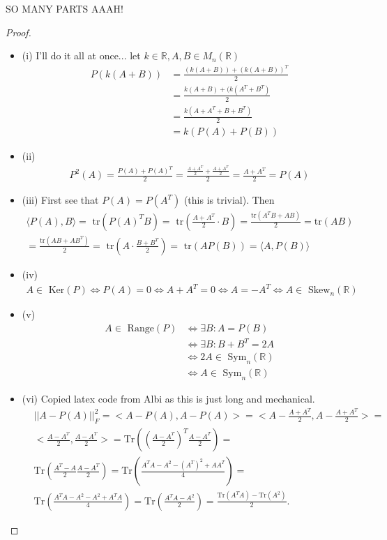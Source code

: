 \documentclass[12pt]{article}
\newenvironment{problem}[2][Problem]{\begin{trivlist}
\item[\hskip \labelsep {\bfseries #1}\hskip \labelsep {\bfseries #2.}]}{\end{trivlist}}
\theoremstyle{definition}
\theoremstyle{definition}
\theoremstyle{definition}
\theoremstyle{definition}
\begin{document}
\begin{problem}{3.48} SO MANY PARTS AAAH!
\begin{proof}
\begin{itemize}
\item (i) I'll do it all at once... let $k \in \mathbb{R}, A,B \in M_n(\mathbb{R})$
\begin{align*}
P(k(A+B)) &= \frac{(k(A+B))+(k(A+B))^T}{2} \\
&= \frac{k(A+B)+(k(A^T+B^T)}{2} \\
&= \frac{k(A+A^T+B+B^T)}{2} \\
&= k(P(A)+P(B))
\end{align*}
\item (ii) 
\begin{align*}
P^2(A) = \frac{P(A)+P(A)^T}{2} = \frac{\frac{A+A^T}{2}+\frac{A+A^T}{2}}{2} = \frac{A+A^T}{2} = P(A)
\end{align*}
\item (iii) First see that $P(A) = P(A^T)$ (this is trivial). Then
\begin{align*}
\langle P(A), B \rangle = \text{ tr}(P(A)^TB) =\text{ tr}(\frac{A+A^T}{2} \cdot B) = \frac{\text{tr}(A^TB+AB)}{2} = \text{tr}(AB) \\
= \frac{\text{tr}(AB+AB^T)}{2} =  \text{ tr}(A \cdot \frac{B+B^T}{2}) = \text{ tr}(AP(B)) = \langle A, P(B) \rangle 
\end{align*}
\item (iv) 
\begin{align*}
A \in \text{ Ker}(P) \iff P(A) = 0 \iff A+A^T = 0 \iff A = -A^T \iff A \in \text{ Skew}_n(\mathbb{R})
\end{align*}
\item (v)
\begin{align*}
A \in \text{ Range}(P) &\iff \exists B : A = P(B) \\
&\iff \exists B: B + B^T = 2A \\
&\iff 2A \in \text{ Sym}_n(\mathbb{R}) \\
&\iff A \in \text{ Sym}_n(\mathbb{R}) 
\end{align*}
\item (vi) Copied latex code from Albi as this is just long and mechanical.
\begin{align*}
    &||A - P(A)||_F^2 = <A - P(A), A - P(A)> =
    <A - \frac{A + A^T}{2}, A - \frac{A + A^T}{2}> =\\
    &<\frac{A - A^T}{2}, \frac{A - A^T}{2}> = 
    \text{Tr}\left(\left(\frac{A - A^T}{2}\right)^T\frac{A - A^T}{2}\right)=\\
    &\text{Tr}\left(\frac{A^T - A}{2}\frac{A - A^T}{2}\right) = 
    \text{Tr}\left(\frac{A^TA - A^2 - (A^T)^2 + AA^T}{4}\right) =\\ 
    &\text{Tr}\left(\frac{A^TA - A^2 - A^2 + A^TA}{4}\right) =
    \text{Tr}\left(\frac{A^TA - A^2}{2}\right) = 
    \frac{\text{Tr}(A^TA) - \text{Tr}(A^2)}{2}.
\end{align*}
\end{itemize}
\end{proof}
\end{problem}
\end{document}
